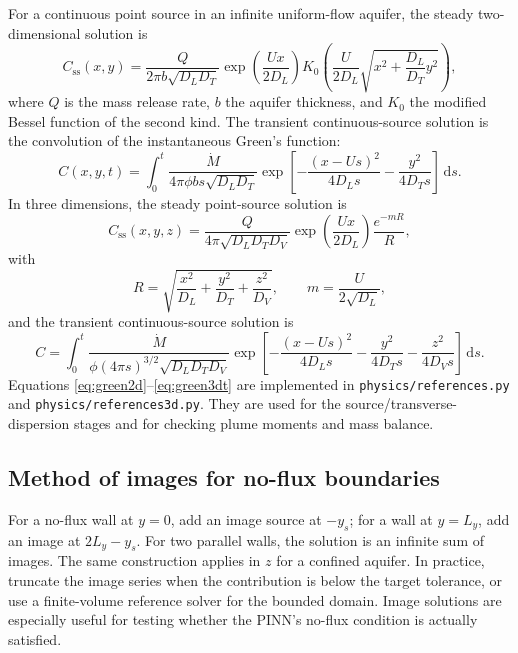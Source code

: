 \documentclass[11pt]{article}
\newcommand{\dd}{\,\mathrm{d}}
\begin{document}
For a continuous point source in an infinite uniform-flow aquifer, the steady
two-dimensional solution is
\begin{equation}
\label{eq:green2d}
C_{\mathrm{ss}}(x,y)=\frac{Q}{2\pi b\sqrt{D_LD_T}}
\exp\!\left(\frac{Ux}{2D_L}\right)
K_0\!\left(\frac{U}{2D_L}\sqrt{x^2+\frac{D_L}{D_T}y^2}\right),
\end{equation}
where $Q$ is the mass release rate, $b$ the aquifer thickness, and $K_0$ the
modified Bessel function of the second kind.  The transient continuous-source
solution is the convolution of the instantaneous Green's function:
\begin{equation}
\label{eq:green2dt}
C(x,y,t)=\int_0^t
\frac{\dot M}{4\pi\phi b s\sqrt{D_LD_T}}
\exp\!\left[-\frac{(x-Us)^2}{4D_Ls}-\frac{y^2}{4D_Ts}\right]\dd s.
\end{equation}
In three dimensions, the steady point-source solution is
\begin{equation}
\label{eq:green3d}
C_{\mathrm{ss}}(x,y,z)=\frac{Q}{4\pi\sqrt{D_LD_TD_V}}
\exp\!\left(\frac{Ux}{2D_L}\right)\frac{e^{-mR}}{R},
\end{equation}
with
\begin{equation}
\label{eq:green3dR}
R=\sqrt{\frac{x^2}{D_L}+\frac{y^2}{D_T}+\frac{z^2}{D_V}},
\qquad
m=\frac{U}{2\sqrt{D_L}},
\end{equation}
and the transient continuous-source solution is
\begin{equation}
\label{eq:green3dt}
C=\int_0^t
\frac{\dot M}{\phi(4\pi s)^{3/2}\sqrt{D_LD_TD_V}}
\exp\!\left[-\frac{(x-Us)^2}{4D_Ls}
-\frac{y^2}{4D_Ts}-\frac{z^2}{4D_Vs}\right]\dd s.
\end{equation}
Equations \eqref{eq:green2d}--\eqref{eq:green3dt} are implemented in
\texttt{physics/references.py} and \texttt{physics/references3d.py}.  They are
used for the source/transverse-dispersion stages and for checking plume
moments and mass balance.

\subsection{Method of images for no-flux boundaries}

For a no-flux wall at $y=0$, add an image source at $-y_s$; for a wall at
$y=L_y$, add an image at $2L_y-y_s$.  For two parallel walls, the solution is
an infinite sum of images.  The same construction applies in $z$ for a
confined aquifer.  In practice, truncate the image series when the contribution
is below the target tolerance, or use a finite-volume reference solver for the
bounded domain.  Image solutions are especially useful for testing whether the
PINN's no-flux condition is actually satisfied.
\end{document}
